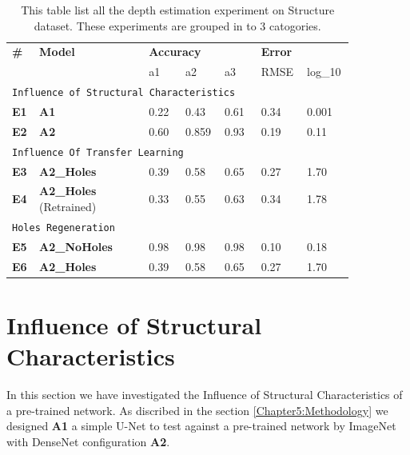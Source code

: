 \begin{table}[b]
\begin{tabular}{p{0.05\linewidth}p{0.3\linewidth}p{0.1\linewidth}p{0.1\linewidth}p{0.1\linewidth}p{0.1\linewidth}p{0.1\linewidth}}
\hline
\textbf{\#} & \textbf{Model} & \multicolumn{3}{l}{\textbf{Accuracy}} & \multicolumn{2}{l}{\textbf{Error}} \\ \cline{3-7} 
                    &                        & a1       & a2       & a3      & RMSE         & log\_10      \\ \hline
\multicolumn{7}{l}{\texttt{Influence of Structural Characteristics}}                                            \\ \hline
\textbf{E1}                  &  \textbf{A1}  & 0.22         & 0.43          &  0.61       & 0.34            &   0.001           \\ \hline
\textbf{E2}                  & \textbf{A2}  &    0.60  & 0.859 & 0.93       &   0.19          &0.11              \\ \hline
\multicolumn{7}{l}{\texttt{Influence Of Transfer Learning}}                                                                   \\ \hline
\textbf{E3}                  & \textbf{A2\_Holes}              & 0.39   & 0.58   & 0.65  & 0.27      & 1.70       \\ \hline
\textbf{E4}                  & \textbf{A2\_Holes} (Retrained) & 0.33   & 0.55   & 0.63  & 0.34      & 1.78       \\ \hline
\multicolumn{7}{l}{\texttt{Holes Regeneration}}                                                       \\ \hline
\textbf{E5}                  & \textbf{A2\_NoHoles}            & 0.98   & 0.98   & 0.98  & 0.10       & 0.18        \\ \hline
\textbf{E6}                  & \textbf{A2\_Holes}              & 0.39   & 0.58   & 0.65  & 0.27      & 1.70       \\ \hline
\end{tabular}

\caption{This table list all the depth estimation experiment on Structure dataset. These experiments are grouped in to 3 catogories.}
\label{table:Results_main}
\end{table}


\section{Influence of Structural Characteristics}
\label{Chapter6:Influence_Structural_Char}
In this section we have investigated the Influence of Structural Characteristics of a pre-trained network.  As discribed in the section \ref{Chapter5:Methodology} we designed \textbf{A1} a simple U-Net to test against a pre-trained network by ImageNet with DenseNet configuration \textbf{A2}. 
 

